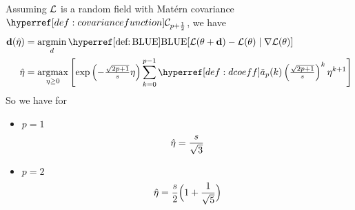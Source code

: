 \begin{theorem}
	Assuming \(\mathcal{L}\) is a random field with Matérn covariance
	\(\C_{p+\frac12}\), we have
	\begin{align*}
		\step(\hat{\lr})
		&= \argmin_{d}
		\BLUE[\Loss(\param + \step) - \Loss(\param)\mid \grad\Loss(\param)]\\
		\hat{\lr}
		&= \argmax_{\lr\ge0}\left[
			\exp\left(-\tfrac{\sqrt{2p+1}}{s}\lr\right)
			\sum_{k=0}^{p-1}\dcoeff(k)\left(\tfrac{\sqrt{2p+1}}{s}\right)^k \lr^{k+1}
		\right]
	\end{align*}
	So we have for
	\begin{itemize}
		\item \(p=1\)
		\begin{equation*}
			\hat{\eta} = \frac{s}{\sqrt{3}}
		\end{equation*}

		\item \(p=2\)
		\begin{equation*}
			\hat{\eta}
			= \frac{s}{2}\Big(1+\frac{1}{\sqrt{5}}\Big)
		\end{equation*}
	\end{itemize}
\end{theorem}

